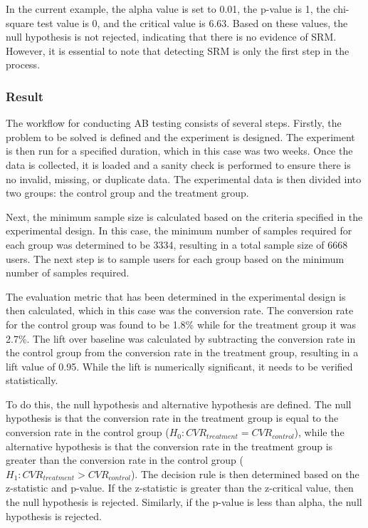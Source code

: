 \documentclass{article}
\begin{document}
In the current example, the alpha value is set to 0.01, the p-value is 1, the chi-square test value is 0, and the critical value is 6.63. Based on these values, the null hypothesis is not rejected, indicating that there is no evidence of SRM. However, it is essential to note that detecting SRM is only the first step in the process.

\subsubsection*{Result} 

The workflow for conducting AB testing consists of several steps. Firstly, the problem to be solved is defined and the experiment is designed. The experiment is then run for a specified duration, which in this case was two weeks. Once the data is collected, it is loaded and a sanity check is performed to ensure there is no invalid, missing, or duplicate data. The experimental data is then divided into two groups: the control group and the treatment group.

Next, the minimum sample size is calculated based on the criteria specified in the experimental design. In this case, the minimum number of samples required for each group was determined to be 3334, resulting in a total sample size of 6668 users. The next step is to sample users for each group based on the minimum number of samples required.

The evaluation metric that has been determined in the experimental design is then calculated, which in this case was the conversion rate. The conversion rate for the control group was found to be 1.8\% while for the treatment group it was 2.7\%. The lift over baseline was calculated by subtracting the conversion rate in the control group from the conversion rate in the treatment group, resulting in a lift value of 0.95. While the lift is numerically significant, it needs to be verified statistically.

To do this, the null hypothesis and alternative hypothesis are defined. The null hypothesis is that the conversion rate in the treatment group is equal to the conversion rate in the control group ($H_0 : {CVR}_{treatment} = {CVR}_{control} $), while the alternative hypothesis is that the conversion rate in the treatment group is greater than the conversion rate in the control group ($H_1 : {CVR}_{treatment} > {CVR}_{control} $). The decision rule is then determined based on the z-statistic and p-value. If the z-statistic is greater than the z-critical value, then the null hypothesis is rejected. Similarly, if the p-value is less than alpha, the null hypothesis is rejected.
\end{document}
